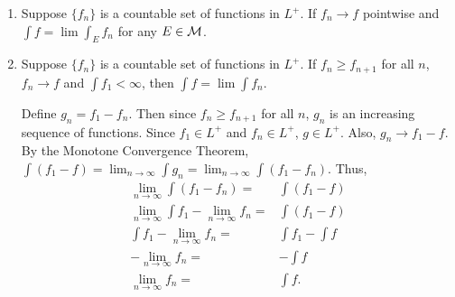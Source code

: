 \begin{enumerate}
\item Suppose $\{f_n\}$ is a countable set of functions in $L^+$. If $f_n \rightarrow f$ pointwise and $\int f = \lim \int_E f_n$ for any $E \in {\mathcal M}$. \\
\item Suppose $\{f_n\}$ is a countable set of functions in $L^+$. If $f_n \geq f_{n+1}$ for all $n$, $f_n \rightarrow f$ and $\int f_1 < \infty$, then $\int f= \lim \int f_n$.	
\begin{pf}
Define $g_n = f_1-f_n$. Then since $f_n \geq f_{n+1}$ for all $n$, $g_n$ is an increasing sequence of functions. Since $ f_1 \in L^+$ and $f_n \in L^+$, $g \in L^+$. Also, $g_n \rightarrow f_1-f$. By the Monotone Convergence Theorem, $\int (f_1-f) = \lim_{n \rightarrow \infty} \int g_n=\lim_{n \rightarrow \infty} \int (f_1-f_n)$. Thus,
\[
\begin{array}{cc}
	\lim\limits_{n \rightarrow \infty} \int (f_1-f_n) = & \int (f_1 - f)\\
	\lim\limits_{n \rightarrow \infty} \int f_1-\lim\limits_{n \rightarrow \infty}f_n = & \int (f_1 - f)\\
		 \int f_1-\lim\limits_{n \rightarrow \infty}f_n = & \int f_1 - \int f\\
		 -\lim\limits_{n \rightarrow \infty}f_n = &  - \int f\\
		 \lim\limits_{n \rightarrow \infty}f_n = &   \int f .\\
\end{array}
\]
\end{pf}

\end{enumerate}
